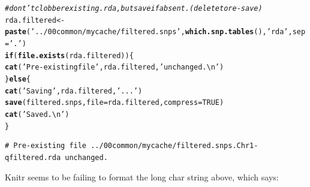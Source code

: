 \documentclass{article}\usepackage[]{graphicx}\usepackage[]{color}
\makeatletter
\newcommand{\hlnum}[1]{\textcolor[rgb]{0.686,0.059,0.569}{#1}}%
\newcommand{\hlstr}[1]{\textcolor[rgb]{0.192,0.494,0.8}{#1}}%
\newcommand{\hlcom}[1]{\textcolor[rgb]{0.678,0.584,0.686}{\textit{#1}}}%
\newcommand{\hlstd}[1]{\textcolor[rgb]{0.345,0.345,0.345}{#1}}%
\newcommand{\hlkwa}[1]{\textcolor[rgb]{0.161,0.373,0.58}{\textbf{#1}}}%
\newcommand{\hlkwb}[1]{\textcolor[rgb]{0.69,0.353,0.396}{#1}}%
\newcommand{\hlkwc}[1]{\textcolor[rgb]{0.333,0.667,0.333}{#1}}%
\newcommand{\hlkwd}[1]{\textcolor[rgb]{0.737,0.353,0.396}{\textbf{#1}}}%
\newenvironment{kframe}{%
 \def\at@end@of@kframe{}%
 \ifinner\ifhmode%
  \def\at@end@of@kframe{\end{minipage}}%
  \begin{minipage}{\columnwidth}%
 \fi\fi%
 \def\FrameCommand##1{\hskip\@totalleftmargin \hskip-\fboxsep
 \colorbox{shadecolor}{##1}\hskip-\fboxsep
     \hskip-\linewidth \hskip-\@totalleftmargin \hskip\columnwidth}%
 \MakeFramed {\advance\hsize-\width
   \@totalleftmargin\z@ \linewidth\hsize
   \@setminipage}}%
 {\par\unskip\endMakeFramed%
 \at@end@of@kframe}
\newenvironment{knitrout}{}{} %
\makeatother
\begin{document}
\begin{knitrout}
\begin{kframe}
\begin{alltt}
\hlcom{# dont't clobber existing .rda, but save if absent.  (delete to re-save)}
\hlstd{rda.filtered} \hlkwb{<-} \hlkwd{paste}\hlstd{(}\hlstr{'../00common/mycache/filtered.snps'}\hlstd{,} \hlkwd{which.snp.tables}\hlstd{(),} \hlstr{'rda'}\hlstd{,} \hlkwc{sep}\hlstd{=}\hlstr{'.'}\hlstd{)}
\hlkwa{if}\hlstd{(}\hlkwd{file.exists}\hlstd{(rda.filtered))\{}
  \hlkwd{cat}\hlstd{(}\hlstr{'Pre-existing file'}\hlstd{, rda.filtered,} \hlstr{'unchanged.\textbackslash{}n'}\hlstd{)}
\hlstd{\}} \hlkwa{else} \hlstd{\{}
  \hlkwd{cat}\hlstd{(}\hlstr{'Saving'}\hlstd{, rda.filtered,} \hlstr{'...'}\hlstd{)}
  \hlkwd{save}\hlstd{(filtered.snps,} \hlkwc{file}\hlstd{=rda.filtered,} \hlkwc{compress}\hlstd{=}\hlnum{TRUE}\hlstd{)}
  \hlkwd{cat}\hlstd{(}\hlstr{'Saved.\textbackslash{}n'}\hlstd{)}
\hlstd{\}}
\end{alltt}
\begin{verbatim}
# Pre-existing file ../00common/mycache/filtered.snps.Chr1-qfiltered.rda unchanged.
\end{verbatim}
\end{kframe}
\end{knitrout}

Knitr seems to be failing to format the long char string above, which says:
\end{document}
